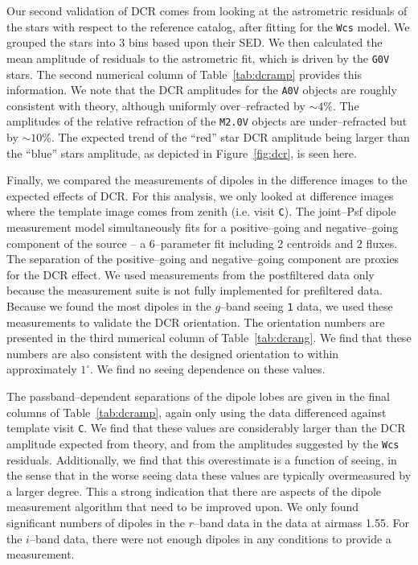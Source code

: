 \documentclass[DM,toc]{lsstdoc}
\def\C{{\tt C}}
\begin{document}
Our second validation of DCR comes from looking at the astrometric
residuals of the stars with respect to the reference catalog, after
fitting for the {\tt Wcs} model.  We grouped the stars into 3 bins
based upon their SED.  We then calculated the mean amplitude of
residuals to the astrometric fit, which is driven by the {\tt G0V}
stars.  The second numerical column of Table~\ref{tab:dcramp} provides
this information.  We note that the DCR amplitudes for the {\tt A0V}
objects are roughly consistent with theory, although uniformly
over--refracted by $\sim 4\%$.  The amplitudes of the relative
refraction of the {\tt M2.0V} objects are under--refracted but by
$\sim 10\%$.  The expected trend of the ``red'' star DCR amplitude
being larger than the ``blue'' stars amplitude, as depicted in
Figure~\ref{fig:dcr}, is seen here.

Finally, we compared the measurements of dipoles in the difference
images to the expected effects of DCR.  For this analysis, we only
looked at difference images where the template image comes from zenith
(i.e. visit \C).  The joint--Psf dipole measurement model
simultaneously fits for a positive--going and negative--going
component of the source -- a 6--parameter fit including 2 centroids
and 2 fluxes.  The separation of the positive--going and
negative--going component are proxies for the DCR effect.  We used
measurements from the postfiltered data only because the measurement
suite is not fully implemented for prefiltered data.  Because we found
the most dipoles in the $g$--band seeing {\tt 1} data, we used these
measurements to validate the DCR orientation.  The orientation numbers
are presented in the third numerical column of Table~\ref{tab:dcrang}.
We find that these numbers are also consistent with the designed
orientation to within approximately $1^{\circ}$.  We find no seeing
dependence on these values.

The passband--dependent separations of the dipole lobes are given in
the final columns of Table~\ref{tab:dcramp}, again only using the data
differenced against template visit \C.  We find that these values are
considerably larger than the DCR amplitude expected from theory, and
from the amplitudes suggested by the {\tt Wcs} residuals.
Additionally, we find that this overestimate is a function of seeing,
in the sense that in the worse seeing data these values are typically
overmeasured by a larger degree.  This a strong indication that there
are aspects of the dipole measurement algorithm that need to be
improved upon.  We only found significant numbers of dipoles in the
$r$--band data in the data at airmass 1.55.  For the $i$--band data,
there were not enough dipoles in any conditions to provide a
measurement.
\end{document}
